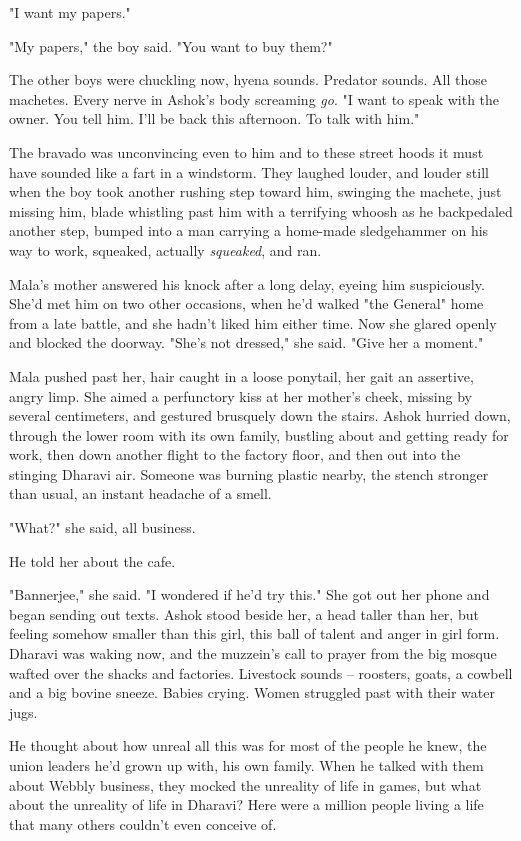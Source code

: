 "I want my papers."

"My papers," the boy said. "You want to buy them?"

The other boys were chuckling now, hyena sounds. Predator sounds.
All those machetes. Every nerve in Ashok's body screaming
\emph{go}. "I want to speak with the owner. You tell him. I'll be
back this afternoon. To talk with him."

The bravado was unconvincing even to him and to these street hoods
it must have sounded like a fart in a windstorm. They laughed
louder, and louder still when the boy took another rushing step
toward him, swinging the machete, just missing him, blade whistling
past him with a terrifying whoosh as he backpedaled another step,
bumped into a man carrying a home-made sledgehammer on his way to
work, squeaked, actually \emph{squeaked}, and ran.

Mala's mother answered his knock after a long delay, eyeing him
suspiciously. She'd met him on two other occasions, when he'd
walked "the General" home from a late battle, and she hadn't liked
him either time. Now she glared openly and blocked the doorway.
"She's not dressed," she said. "Give her a moment."

Mala pushed past her, hair caught in a loose ponytail, her gait an
assertive, angry limp. She aimed a perfunctory kiss at her mother's
cheek, missing by several centimeters, and gestured brusquely down
the stairs. Ashok hurried down, through the lower room with its own
family, bustling about and getting ready for work, then down
another flight to the factory floor, and then out into the stinging
Dharavi air. Someone was burning plastic nearby, the stench
stronger than usual, an instant headache of a smell.

"What?" she said, all business.

He told her about the cafe.

"Bannerjee," she said. "I wondered if he'd try this." She got out
her phone and began sending out texts. Ashok stood beside her, a
head taller than her, but feeling somehow smaller than this girl,
this ball of talent and anger in girl form. Dharavi was waking now,
and the muzzein's call to prayer from the big mosque wafted over
the shacks and factories. Livestock sounds -- roosters, goats, a
cowbell and a big bovine sneeze. Babies crying. Women struggled
past with their water jugs.

He thought about how unreal all this was for most of the people he
knew, the union leaders he'd grown up with, his own family. When he
talked with them about Webbly business, they mocked the unreality
of life in games, but what about the unreality of life in Dharavi?
Here were a million people living a life that many others couldn't
even conceive of.

